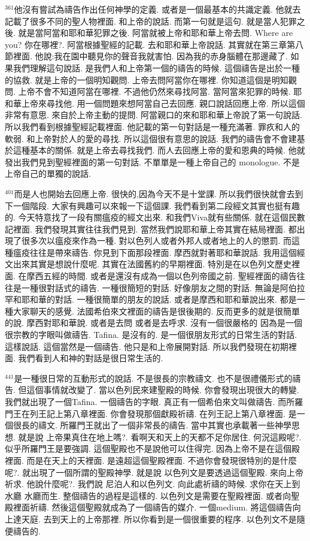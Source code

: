 \documentclass{book}
\begin{document}
$^{361}$他沒有嘗試為禱告作出任何神學的定義.
或者是一個最基本的共識定義.
他就去記載了很多不同的聖人物裡面.
和上帝的說話.
而第一句就是這句.
就是當人犯罪之後.
就是當阿當和耶和華犯罪之後.
阿當就被上帝和耶和華上帝去問.
Where are you? 你在哪裡?.
阿當根據聖經的記載.
去和耶和華上帝說話.
其實就在第三章第八節裡面.
他說:我在園中聽見你的聲音我就害怕.
因為我的赤身腦體在那邊藏了.
如果我們理解這句說話.
是我們人和上帝第一個的禱告的時候.
這個禱告是出於一種的協救.
就是上帝的一個明知觀問.
上帝去問阿當你在哪裡.
你知道這個是明知觀問.
上帝不會不知道阿當在哪裡.
不過他仍然來尋找阿當.
當阿當來犯罪的時候.
耶和華上帝來尋找他.
用一個問題來想阿當自己去回應.
親口說話回應上帝.
所以這個非常有意思.
來自於上帝主動的提問.
阿當親口的來和耶和華上帝說了第一句說話.
所以我們看到根據聖經記載裡面.
他記載的第一句對話是一種充滿著.
罪疚和人的軟弱.
和上帝對於人的愛的尋找.
所以這個很有意思的說話.
我們的禱告會不會建基於這種基本的關係.
就是上帝去尋找我們.
而人去回應上帝的愛和恩典的時候.
他就發出我們見到聖經裡面的第一句對話.
不單單是一種上帝自己的 monologue.
不是上帝自己的單獨的說話.

$^{401}$而是人也開始去回應上帝.
很快的,因為今天不是十堂課.
所以我們很快就會去到下一個階段.
大家有興趣可以來報一下這個課.
我們看到第二段經文其實也挺有趣的.
今天特意找了一段有關瘟疫的經文出來.
和我們Viva就有些關係.
就在這個民數記裡面.
我們發現其實往往我們見到.
當然我們說耶和華上帝其實在結局裡面.
都出現了很多次以瘟疫來作為一種.
對以色列人或者外邦人或者地上的人的懲罰.
而這種瘟疫往往是帶來禱告.
你見到下面那段裡面.
摩西就對著耶和華說話.
我用這個經文出來其實是想說什麼呢.
其實在法國舊約的早期裡面.
特別是在以色列文歷史裡面.
在摩西五經的時間.
或者是還沒有成為一個以色列帝國之前.
聖經裡面的禱告往往是一種很對話式的禱告.
一種很簡短的對話.
好像朋友之間的對話.
無論是阿伯拉罕和耶和華的對話.
一種很簡單的朋友的說話.
或者是摩西和耶和華說出來.
都是一種大家聊天的感覺.
法國希伯來文裡面的禱告是很後期的.
反而更多的就是很簡單的說.
摩西對耶和華說.
或者是去問 或者是去呼求.
沒有一個很嚴格的 因為是一個很宗教的字眼叫做禱告.
Tafina.
是沒有的.
是一個很朋友形式的日常生活的對話.
這樣說話.
這個當然是一個禱告.
他只是和上帝展開對話.
所以我們發現在初期裡面.
我們看到人和神的對話是很日常生活的.

$^{441}$是一種很日常的互動形式的說話.
不是很長的宗教禱文.
也不是很禮儀形式的禱告.
但這個事情就改變了.
當以色列民來建聖殿的時候.
你會發現出現很大的轉變.
我們就出現了一個Tafina.
一個禱告的字眼.
真正有一個希伯來文叫做禱告.
而所羅門王在列王記上第八章裡面.
你會發現那個獻殿祈禱.
在列王記上第八章裡面.
是一個很長的禱文.
所羅門王就出了一個非常長的禱告.
當中其實也承載著一些神學思想.
就是說 上帝果真住在地上嗎?.
看啊天和天上的天都不足你居住.
何況這殿呢?.
似乎所羅門王是要強調.
這個聖殿也不是說他可以住得完.
因為上帝不是在這個殿裡面.
而是在天上的天裡面.
是遠超這個聖殿裡面.
不過你會發現很特別的是什麼呢?.
就出現了一個所謂的聖殿神學.
就是說 以色列文是要透過這個聖殿.
來向上帝祈求.
他說什麼呢?.
我們說 尼泊人和以色列文.
向此處祈禱的時候.
求你在天上到水廳 水廳而生.
整個禱告的過程是這樣的.
以色列文是需要在聖殿裡面.
或者向聖殿裡面祈禱.
然後這個聖殿就成為了一個禱告的媒介.
一個medium.
將這個禱告向上達天庭.
去到天上的上帝那裡.
所以你看到是一個很重要的程序.
以色列文不是隨便禱告的.
\end{document}
